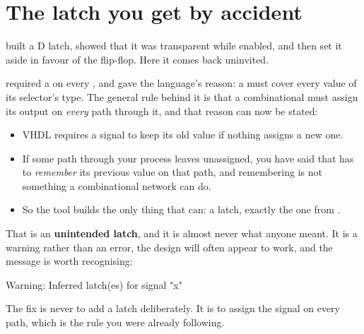 \section{The latch you get by accident}
\label{c5:sec:latch}

 built a D latch, showed that it was transparent while enabled, and then set it
aside in favour of the flip-flop. Here it comes back uninvited.

 required a  on every , and gave the language's
reason: a  must cover every value of its selector's type. The general rule behind it is
that a combinational  must assign its output on \emph{every} path through it, and
that reason can now be stated:
\begin{itemize}
  \item VHDL requires a signal to keep its old value if nothing assigns a new one.
  \item If some path through your process leaves  unassigned, you have said that 
    has to \emph{remember} its previous value on that path, and remembering is not something a
    combinational network can do.
  \item So the tool builds the only thing that can: a latch, exactly the one from
    .
\end{itemize}

That is an \textbf{unintended latch}, and it is almost never what anyone meant. It is a warning
rather than an error, the design will often appear to work, and the message is worth recognising:

\begin{console}
Warning: Inferred latch(es) for signal "x"
\end{console}

The fix is never to add a latch deliberately. It is to assign the signal on every path, which is the
rule you were already following.
